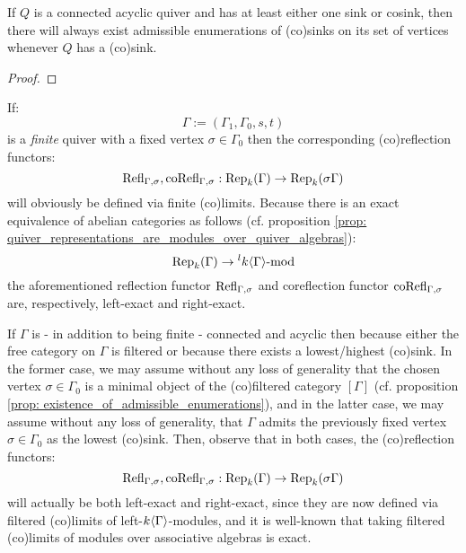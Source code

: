             \begin{proposition} \label{prop: existence_of_admissible_enumerations}
                If $Q$ is a connected acyclic quiver and has at least either one sink or cosink, then there will always exist admissible enumerations of (co)sinks on its set of vertices whenever $Q$ has a (co)sink. 
            \end{proposition}
                \begin{proof}
                    
                \end{proof}
            \begin{remark} \label{remark: (co)reflection_functors_on_finite_connected_acyclic_quivers_are_exact}
                If:
                    $$\Gamma := (\Gamma_1, \Gamma_0, s, t)$$
                is a \textit{finite} quiver with a fixed vertex $\sigma \in \Gamma_0$ then the corresponding (co)reflection functors:
                    $$\mathrm{Refl}_{\Gamma, \sigma}, \mathrm{co}\mathrm{Refl}_{\Gamma, \sigma}: \mathrm{Rep}_k(\Gamma) \to \mathrm{Rep}_k(\sigma \Gamma)$$
                will obviously be defined via finite (co)limits. Because there is an exact equivalence of abelian categories as follows (cf. proposition \ref{prop: quiver_representations_are_modules_over_quiver_algebras}):
                    $$\mathrm{Rep}_k(\Gamma) \to {}^lk\langle\Gamma\rangle\text{-}\mathrm{mod}$$
                the aforementioned reflection functor $\mathrm{Refl}_{\Gamma, \sigma}$ and coreflection functor $\mathrm{co}\mathrm{Refl}_{\Gamma, \sigma}$ are, respectively, left-exact and right-exact.
                
                If $\Gamma$ is - in addition to being finite - connected and acyclic then because either the free category on $\Gamma$ is filtered or because there exists a lowest/highest (co)sink. In the former case, we may assume without any loss of generality that the chosen vertex $\sigma \in \Gamma_0$ is a minimal object of the (co)filtered category $[\Gamma]$ (cf. proposition \ref{prop: existence_of_admissible_enumerations}), and in the latter case, we may assume without any loss of generality, that $\Gamma$ admits the previously fixed vertex $\sigma \in \Gamma_0$ as the lowest (co)sink. Then, observe that in both cases, the (co)reflection functors:
                    $$\mathrm{Refl}_{\Gamma, \sigma}, \mathrm{co}\mathrm{Refl}_{\Gamma, \sigma}: \mathrm{Rep}_k(\Gamma) \to \mathrm{Rep}_k(\sigma \Gamma)$$
                will actually be both left-exact and right-exact, since they are now defined via filtered (co)limits of left-$k\langle\Gamma\rangle$-modules, and it is well-known that taking filtered (co)limits of modules over associative algebras is exact.
            \end{remark}
